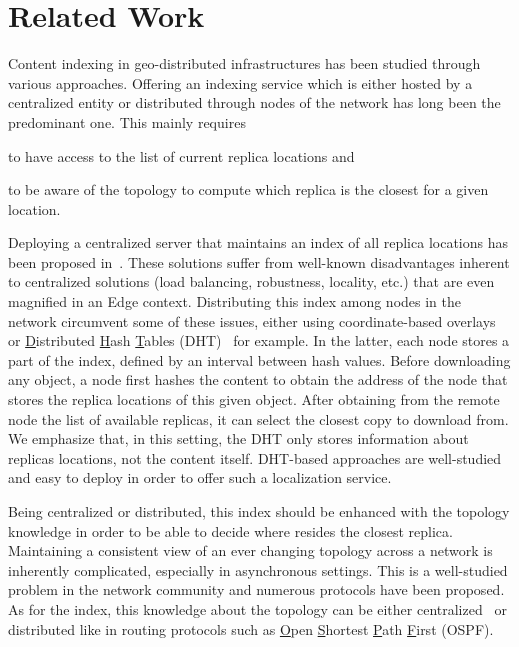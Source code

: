 
\section{Related Work}
\label{sec:related_work}

Content indexing in geo-distributed infrastructures has been studied
through various approaches.  Offering an indexing service which is
either hosted by a centralized entity or distributed through nodes of
the network has long been the predominant one. This mainly requires
\begin{inparaenum}[(i)]
\item to have access to the list of current replica locations and
\item to be aware of the topology to compute which replica is the
  closest for a given location.
\end{inparaenum}

Deploying a centralized server that maintains an index of all replica
locations has been proposed in~\cite{snamp, p2p-oracle, fogstore,
  p2p-alto}. These solutions suffer from well-known disadvantages
inherent to centralized solutions (load balancing, robustness,
locality, etc.) that are even magnified in an Edge context.
Distributing this index among nodes in the network circumvent some of
these issues, either using coordinate-based overlays~\cite{voronet,
  coin_19} or \underline{D}istributed \underline{H}ash
\underline{T}ables (DHT)~\cite{ipfs, mdht, squirrel} for example. In
the latter, each node stores a part of the index, defined by an
interval between hash values.  Before downloading any object, a node
first hashes the content to obtain the address of the node that stores
the replica locations of this given object. After obtaining from the
remote node the list of available replicas, it can select the closest
copy to download from. We emphasize that, in this setting, the DHT
only stores information about replicas locations, not the content
itself. DHT-based approaches are well-studied and easy to deploy in
order to offer such a localization service.

Being centralized or distributed, this index should be enhanced with
the topology knowledge in order to be able to decide where resides the
closest replica. Maintaining a consistent view of an ever changing
topology across a network is inherently complicated, especially in
asynchronous settings. This is a well-studied problem in the network
community and numerous protocols have been proposed. As for the index,
this knowledge about the topology can be either
centralized~\cite{topology-discovery} or distributed like in routing
protocols such as \underline{O}pen \underline{S}hortest
\underline{P}ath \underline{F}irst (OSPF).

